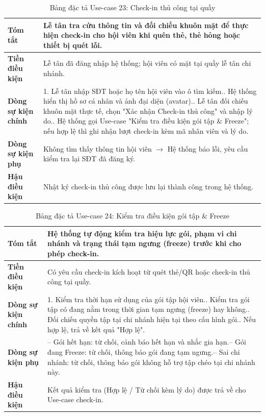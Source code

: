 \documentclass[a4paper,12pt]{article}
\begin{document}
\begin{table}[H]\centering\footnotesize
\begin{tabularx}{\textwidth}{|L{3.2cm}|Y|}
\hline \textbf{Tóm tắt} & Lễ tân tra cứu thông tin và đối chiếu khuôn mặt để thực hiện check-in cho hội viên khi quên thẻ, thẻ hỏng hoặc thiết bị quét lỗi. \\ \hline
\textbf{Tiền điều kiện} & Lễ tân đã đăng nhập hệ thống; hội viên có mặt tại quầy lễ tân chi nhánh. \\ \hline
\textbf{Dòng sự kiện chính} & 1. Lễ tân nhập SĐT hoặc họ tên hội viên vào ô tìm kiếm.. Hệ thống hiển thị hồ sơ cá nhân và ảnh đại diện (avatar).. Lễ tân đối chiếu khuôn mặt thực tế, chọn "Xác nhận Check-in thủ công" và nhập lý do.. Hệ thống gọi Use-case "Kiểm tra điều kiện gói tập \& Freeze"; nếu hợp lệ thì ghi nhận lượt check-in kèm mã nhân viên và lý do. \\ \hline
\textbf{Dòng sự kiện phụ} & Không tìm thấy thông tin hội viên $\rightarrow$ Hệ thống báo lỗi, yêu cầu kiểm tra lại SĐT đã đăng ký. \\ \hline
\textbf{Hậu điều kiện} & Nhật ký check-in thủ công được lưu lại thành công trong hệ thống. \\ \hline
\end{tabularx}
\caption{Bảng đặc tả Use-case 23: Check-in thủ công tại quầy}
\end{table}

\begin{table}[H]\centering\footnotesize
\begin{tabularx}{\textwidth}{|L{3.2cm}|Y|}
\hline \textbf{Tóm tắt} & Hệ thống tự động kiểm tra hiệu lực gói, phạm vi chi nhánh và trạng thái tạm ngưng (freeze) trước khi cho phép check-in. \\ \hline
\textbf{Tiền điều kiện} & Có yêu cầu check-in kích hoạt từ quét thẻ/QR hoặc check-in thủ công tại quầy. \\ \hline
\textbf{Dòng sự kiện chính} & 1. Kiểm tra thời hạn sử dụng của gói tập hội viên.. Kiểm tra gói tập có đang nằm trong thời gian tạm ngưng (freeze) hay không.. Đối chiếu quyền tập tại chi nhánh hiện tại theo cấu hình gói.. Nếu hợp lệ, trả về kết quả "Hợp lệ". \\ \hline
\textbf{Dòng sự kiện phụ} & -- Gói hết hạn: từ chối, cảnh báo hết hạn và nhắc gia hạn.\newline -- Gói đang Freeze: từ chối, thông báo gói đang tạm ngưng.\newline -- Sai chi nhánh: từ chối, thông báo gói không hỗ trợ tập chéo tại chi nhánh này. \\ \hline
\textbf{Hậu điều kiện} & Kết quả kiểm tra (Hợp lệ / Từ chối kèm lý do) được trả về cho Use-case check-in. \\ \hline
\end{tabularx}
\caption{Bảng đặc tả Use-case 24: Kiểm tra điều kiện gói tập \& Freeze}
\end{table}
\end{document}
